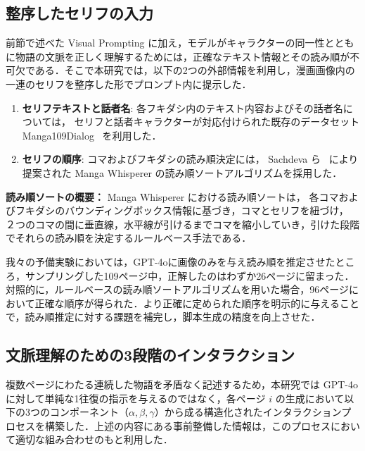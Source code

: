 \documentclass[a4j,12pt]{jsreport}
\begin{document}
\subsection{整序したセリフの入力}
前節で述べた Visual Prompting に加え，モデルがキャラクターの同一性とともに物語の文脈を正しく理解するためには，正確なテキスト情報とその読み順が不可欠である．そこで本研究では，以下の2つの外部情報を利用し，漫画画像内の一連のセリフを整序した形でプロンプト内に提示した．

\begin{enumerate}
   \item \textbf{セリフテキストと話者名}:
         各フキダシ内のテキスト内容およびその話者名については，
         セリフと話者キャラクターが対応付けられた既存のデータセット
         Manga109Dialog~\cite{li_manga109dialog_2024} を利用した．

   \item \textbf{セリフの順序}:
         コマおよびフキダシの読み順決定には，
         Sachdeva ら~\cite{sachdeva_manga_2024-1} により提案された
         Manga Whisperer の読み順ソートアルゴリズムを採用した．
\end{enumerate}

\vspace{0.3em}
\noindent
\textbf{読み順ソートの概要：}
Manga Whisperer における読み順ソートは，
各コマおよびフキダシのバウンディングボックス情報に基づき，コマとセリフを紐づけ，
２つのコマの間に垂直線，水平線が引けるまでコマを縮小していき，引けた段階でそれらの読み順を決定するルールベース手法である．

我々の予備実験においては，GPT-4oに画像のみを与え読み順を推定させたところ，サンプリングした109ページ中，正解したのはわずか26ページに留まった．対照的に，ルールベースの読み順ソートアルゴリズムを用いた場合，96ページにおいて正確な順序が得られた．より正確に定められた順序を明示的に与えることで，読み順推定に対する課題を補完し，脚本生成の精度を向上させた．

\subsection{文脈理解のための3段階のインタラクション}
複数ページにわたる連続した物語を矛盾なく記述するため，本研究では GPT-4o に対して単純な1往復の指示を与えるのではなく，各ページ $i$ の生成において以下の3つのコンポーネント（$\alpha, \beta, \gamma$）から成る構造化されたインタラクションプロセスを構築した．上述の内容にある事前整備した情報は，このプロセスにおいて適切な組み合わせのもと利用した．
\end{document}
